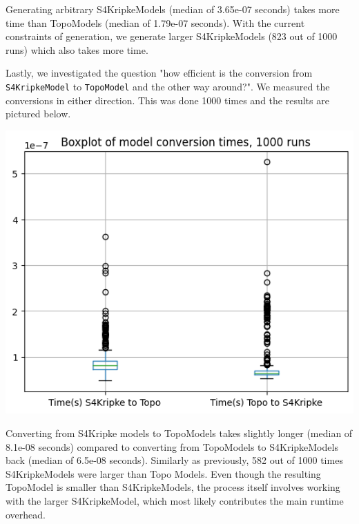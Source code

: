 \documentclass[12pt,a4paper]{article}
\begin{document}
Generating arbitrary S4KripkeModels (median of 3.65e-07 seconds) takes more time than TopoModels 
(median of 1.79e-07 seconds). With the current constraints of generation, we generate larger 
S4KripkeModels (823 out of 1000 runs) which also takes more time.

Lastly, we investigated the question "how efficient is the conversion from \verb|S4KripkeModel| to \verb|TopoModel|
and the other way around?". We measured the conversions in either direction.
This was done 1000 times and the results are pictured below.

\includegraphics*[width=\linewidth]{bench-model-conversion.png}

Converting from S4Kripke models to TopoModels takes slightly longer (median of 8.1e-08 seconds) 
compared to converting from TopoModels to S4KripkeModels back (median of 6.5e-08 seconds). 
Similarly as previously, 582 out of 1000 times S4KripkeModels were larger than Topo Models. 
Even though the resulting TopoModel is smaller than S4KripkeModels, the process itself involves 
working with the larger S4KripkeModel, which most likely contributes the main runtime overhead.





\end{document}

